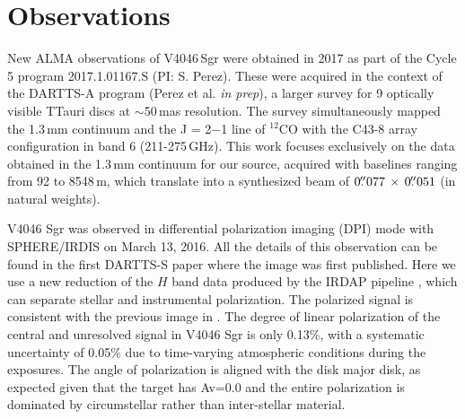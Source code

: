\documentclass[letters,usenatbib,times]{mnras}
\begin{document}
\section{Observations} \label{sec:Observations}


New ALMA observations of V4046\,Sgr were obtained in 2017 as part of the Cycle 5 program 2017.1.01167.S (PI: S. Perez). These were acquired in the context of the DARTTS-A program (Perez et al. {\em in prep}), a larger survey for 9 optically visible TTauri discs at $\sim$50\,mas resolution. The survey simultaneously mapped the 1.3\,mm continuum and the J = 2$-$1 line of $^{12}$CO with the C43-8 array configuration in band 6 (211-275\,GHz). This work focuses exclusively on the data obtained in the 1.3\,mm continuum for our source, acquired with baselines ranging from 92 to 8548\,m, which translate into a synthesized beam of $0\hbox{$.\!\!^{\prime\prime}$}077 \,\times \, 0\hbox{$.\!\!^{\prime\prime}$}051$ (in natural weights).

V4046 Sgr was observed in differential polarization imaging (DPI) mode with SPHERE/IRDIS on March 13, 2016. All the details of this observation can be found in the first DARTTS-S paper \citep{Avenhaus_2018} where the image was first published. Here we use a new reduction of the $H$ band data produced by the IRDAP pipeline \citep{2020A&A...633A..64V}, which can separate stellar and instrumental polarization. The polarized signal is consistent with the previous image in \citet{Avenhaus_2018}. The degree of linear polarization of the central and unresolved signal in V4046 Sgr is only 0.13\%, with a systematic uncertainty of 0.05\% due to time-varying atmospheric conditions during the exposures. The angle of polarization is aligned with the disk major disk, as expected given that the target has Av=0.0 \citep{2016ApJ...828...69M} and the entire polarization is dominated by circumstellar rather than inter-stellar material. 
\end{document}
